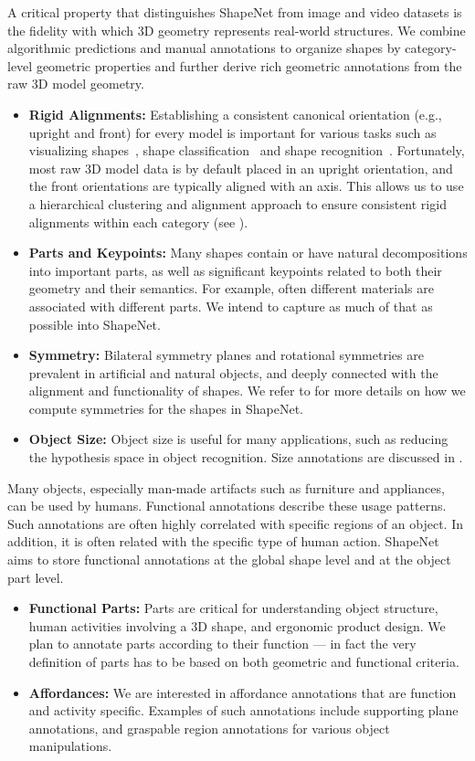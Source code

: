  A critical property that distinguishes ShapeNet from image and video datasets is the fidelity with which 3D geometry represents real-world structures. We combine algorithmic predictions and manual annotations to organize shapes by category-level geometric properties and further derive rich geometric annotations from the raw 3D model geometry.
\begin{itemize}
\item \textbf{Rigid Alignments:}
Establishing a consistent canonical orientation (e.g., upright and front) for every model is important for various tasks such as visualizing shapes~\cite{Kim:2012:fuzzycorres}, shape classification~\cite{huang:2013:fineGrained} and shape recognition~\cite{wu:2014:3d}. Fortunately, most raw 3D model data is by default placed in an upright orientation, and the front orientations are typically aligned with an axis.  This allows us to use a hierarchical clustering and alignment approach to ensure consistent rigid alignments within each category (see ).
\item \textbf{Parts and Keypoints:} Many shapes contain or have natural decompositions into important parts, as well as significant keypoints related to both their geometry and their semantics. For example, often different materials are associated with different parts. We intend to capture as much of that as possible into ShapeNet.
\item \textbf{Symmetry:} Bilateral symmetry planes and rotational symmetries are prevalent in artificial and natural objects, and deeply connected with the alignment and functionality of shapes. We refer to  for more details on how we compute symmetries for the shapes in ShapeNet.
\item \textbf{Object Size:} Object size is useful for many applications, such as reducing the hypothesis space in object recognition. Size annotations are discussed in .
\end{itemize}

 Many objects, especially man-made artifacts such as furniture and appliances, can be used by humans. Functional annotations describe these usage patterns. Such annotations are often highly correlated with specific regions of an object. In addition, it is often related with the specific type of human action. ShapeNet aims to store functional annotations at the global shape level and at the object part level.
\begin{itemize}
\item \textbf{Functional Parts:} Parts are critical for understanding object structure, human activities involving a 3D shape, and ergonomic product design. We plan to annotate parts according to their function --- in fact the very definition of parts has to be based on both geometric and functional criteria.
\item \textbf{Affordances:} We are interested in affordance annotations that are function and activity specific. Examples of such annotations include supporting plane annotations, and graspable region annotations for various object manipulations.
\end{itemize}

